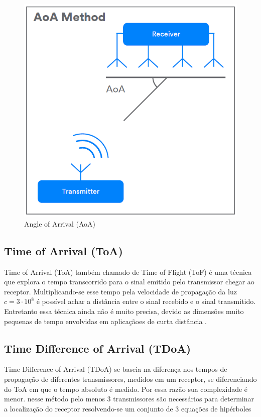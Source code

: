 \begin{figure}[H]
	\centering
	\includegraphics[scale = 0.6]{images/angle_of_arrival.png}
	\caption{Angle of Arrival (AoA)}
	\label{fig:angle_of_arrival}
\end{figure}

\subsection{Time of Arrival (ToA)}

Time of Arrival (ToA) também chamado de  Time of Flight (ToF) é uma técnica que explora o tempo transcorrido para o sinal emitido pelo transmissor chegar ao receptor. Multiplicando-se esse tempo pela velocidade de propagação da luz \(c = 3 \cdot 10^8\) é possível achar a distância entre o sinal recebido e o sinal transmitido. Entretanto essa técnica ainda não é muito precisa, devido as dimensões muito pequenas de tempo envolvidas em aplicaçãoes de curta distância \cite{art6}.

\subsection{Time Difference of Arrival (TDoA)}

Time Difference of Arrival (TDoA) se baseia na diferença nos tempos de propagação de diferentes transmissores, medidos em um receptor, se diferenciando do ToA em que o tempo absoluto é medido. Por essa razão sua complexidade é menor.
nesse método pelo menos 3 transmissores são necessários para determinar a localização do receptor resolvendo-se um conjunto de 3 equações de hipérboles \cite{art2}

